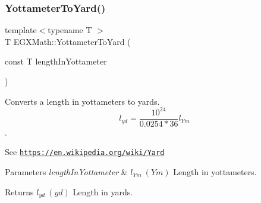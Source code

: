 \subsubsection{\texorpdfstring{Yottameter\+To\+Yard()}{YottameterToYard()}}
{\footnotesize\ttfamily template$<$typename T $>$ \\
T E\+G\+X\+Math\+::\+Yottameter\+To\+Yard (\begin{DoxyParamCaption}\item[{const T}]{length\+In\+Yottameter }\end{DoxyParamCaption})}



Converts a length in yottameters to yards. \[ l_{yd}= \frac{10^{24}}{0.0254 * 36} l_{Ym} \]. 

See \href{https://en.wikipedia.org/wiki/Yard}{\tt https\+://en.\+wikipedia.\+org/wiki/\+Yard} 
\begin{DoxyParams}{Parameters}
{\em length\+In\+Yottameter} & $ l_{Ym}\ (Ym)$ Length in yottameters. \\
\hline
\end{DoxyParams}
\begin{DoxyReturn}{Returns}
$ l_{yd}\ (yd)$ Length in yards. 
\end{DoxyReturn}
